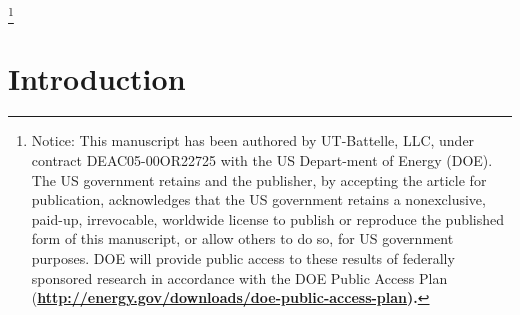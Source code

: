 \documentclass[final, letterpaper, square, comma, numbers, sort&compress]{elsarticle}
\begin{document}
\let\thefootnote\relax\footnote{Notice: This manuscript has been authored by UT-Battelle, LLC, under contract DEAC05-00OR22725 with the US Depart-ment of Energy (DOE). The US government retains and the publisher, by accepting the article for publication, acknowledges that the US government retains a nonexclusive, paid-up, irrevocable, worldwide license to publish or reproduce the published form of this manuscript, or allow others to do so, for US government purposes. DOE will provide public access to these results of federally sponsored research in accordance with the DOE Public Access Plan (\bf \href{http://energy.gov/downloads/doe-public-access-plan}{http://energy.gov/downloads/doe-public-access-plan}).}

\section{Introduction}
\label{S:1}
\end{document}
